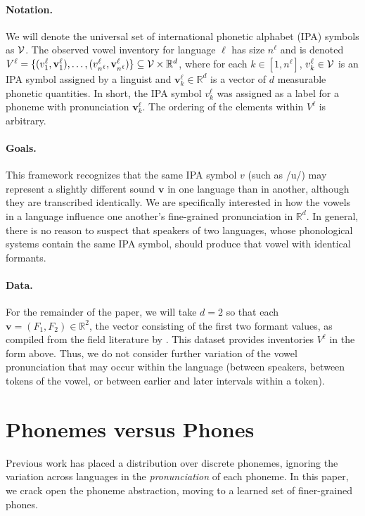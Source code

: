 \documentclass[11pt,a4paper]{article}
\newcommand{\bigV}{{\cal V}}
\renewcommand{\l}{^\ell}
\newcommand{\vv}{{\mathbf{v}}}
\begin{document}
\paragraph{Notation.}
We will denote the universal set of international phonetic alphabet (IPA) symbols as $\bigV$.  The observed vowel inventory for language $\ell$ has size $n\l$ and is denoted $V\l = \{(v\l_1,\vv\l_1), \ldots, (v\l_{n\l},\vv\l_{n\l})\} \subseteq \bigV \times \mathbb{R}^d$, where for each $k \in [1,n\l]$, $v\l_k \in \bigV$ is an IPA symbol assigned by a linguist and $\vv\l_k \in \mathbb{R}^d$ is a vector of $d$ measurable phonetic quantities. In short, the IPA symbol $v\l_k$ was assigned as a label for a phoneme with pronunciation $\vv\l_k$.  The ordering of the elements within $V\l$ is arbitrary.

\paragraph{Goals.}  This framework recognizes that the same IPA symbol $v$ (such as /u/) may represent a slightly different sound $\vv$ in one language than in another, although they are  transcribed identically.  We are specifically interested in how the vowels in a language influence one another's fine-grained pronunciation in $\mathbb{R}^d$.
 In general, there is no reason to suspect that
 speakers of two languages, whose phonological systems contain the same
 IPA symbol, should produce that vowel with identical formants.

\paragraph{Data.} For the remainder of the paper, we will take $d=2$ so that each $\vv = (F_1,F_2) \in \mathbb{R}^2$, the vector consisting of the first two formant values, as compiled from the field literature by .  This dataset provides inventories $V\l$ in the form above.  Thus, we do not consider further variation of the vowel pronunciation that may occur within the language (between speakers, between tokens of the vowel, or between earlier and later intervals within a token).

\section{Phonemes versus Phones}

Previous work \cite{cotterell-eisner:2017:ACL2017} has placed a
distribution over discrete phonemes, ignoring the variation
across languages in the \emph{pronunciation} of each phoneme.  In this
paper, we crack open the phoneme abstraction, moving to a learned set of
finer-grained phones.
\end{document}
